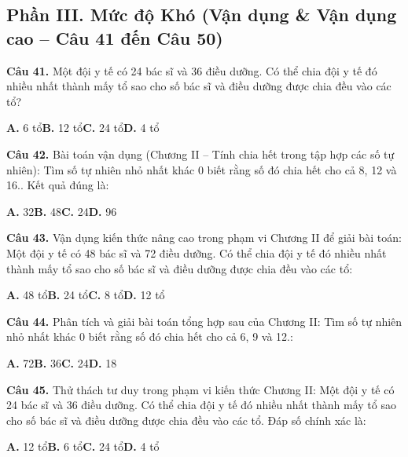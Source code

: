 \documentclass[11pt,a4paper]{article}
\begin{document}
\subsection*{\color{accent} Phần III. Mức độ Khó (Vận dụng \& Vận dụng cao -- Câu 41 đến Câu 50)}
\textbf{\color{primary} Câu 41.} Một đội y tế có 24 bác sĩ và 36 điều dưỡng. Có thể chia đội y tế đó nhiều nhất thành mấy tổ sao cho số bác sĩ và điều dưỡng được chia đều vào các tổ?\par
\hspace*{1.5em}\textbf{A.} 6 tổ\quad\quad \textbf{B.} 12 tổ\quad\quad \textbf{C.} 24 tổ\quad\quad \textbf{D.} 4 tổ\par\vspace{2pt}
\textbf{\color{primary} Câu 42.} Bài toán vận dụng (Chương II – Tính chia hết trong tập hợp các số tự nhiên): Tìm số tự nhiên nhỏ nhất khác 0 biết rằng số đó chia hết cho cả 8, 12 và 16.. Kết quả đúng là:\par
\hspace*{1.5em}\textbf{A.} 32\quad\quad \textbf{B.} 48\quad\quad \textbf{C.} 24\quad\quad \textbf{D.} 96\par\vspace{2pt}
\textbf{\color{primary} Câu 43.} Vận dụng kiến thức nâng cao trong phạm vi Chương II để giải bài toán: Một đội y tế có 48 bác sĩ và 72 điều dưỡng. Có thể chia đội y tế đó nhiều nhất thành mấy tổ sao cho số bác sĩ và điều dưỡng được chia đều vào các tổ:\par
\hspace*{1.5em}\textbf{A.} 48 tổ\quad\quad \textbf{B.} 24 tổ\quad\quad \textbf{C.} 8 tổ\quad\quad \textbf{D.} 12 tổ\par\vspace{2pt}
\textbf{\color{primary} Câu 44.} Phân tích và giải bài toán tổng hợp sau của Chương II: Tìm số tự nhiên nhỏ nhất khác 0 biết rằng số đó chia hết cho cả 6, 9 và 12.:\par
\hspace*{1.5em}\textbf{A.} 72\quad\quad \textbf{B.} 36\quad\quad \textbf{C.} 24\quad\quad \textbf{D.} 18\par\vspace{2pt}
\textbf{\color{primary} Câu 45.} Thử thách tư duy trong phạm vi kiến thức Chương II: Một đội y tế có 24 bác sĩ và 36 điều dưỡng. Có thể chia đội y tế đó nhiều nhất thành mấy tổ sao cho số bác sĩ và điều dưỡng được chia đều vào các tổ. Đáp số chính xác là:\par
\hspace*{1.5em}\textbf{A.} 12 tổ\quad\quad \textbf{B.} 6 tổ\quad\quad \textbf{C.} 24 tổ\quad\quad \textbf{D.} 4 tổ\par\vspace{2pt}
\end{document}
